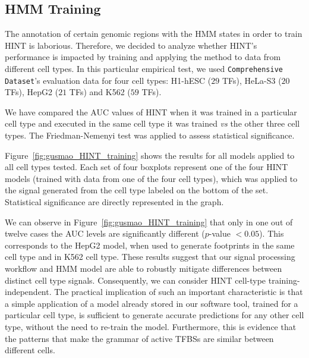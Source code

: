 \subsection{HMM Training}
\label{sec:ps.hmm.training}

The annotation of certain genomic regions with the HMM states in order to train HINT is laborious. Therefore, we decided to analyze whether HINT's performance is impacted by training and applying the method to data from different cell types. In this particular empirical test, we used {\tt Comprehensive Dataset}'s evaluation data for four cell types: H1-hESC ($29$ TFs), HeLa-S3 ($20$ TFs), HepG2 ($21$ TFs) and K562 ($59$ TFs).

We have compared the AUC values of HINT when it was trained in a particular cell type and executed in the same cell type it was trained \emph{vs} the other three cell types. The Friedman-Nemenyi test was applied to assess statistical significance.

Figure~\ref{fig:gusmao_HINT_training} shows the results for all models applied to all cell types tested. Each set of four boxplots represent one of the four HINT models (trained with data from one of the four cell types), which was applied to the signal generated from the cell type labeled on the bottom of the set. Statistical significance are directly represented in the graph.

We can observe in Figure~\ref{fig:gusmao_HINT_training} that only in one out of twelve cases the AUC levels are significantly different ($p$-value $< 0.05$). This corresponds to the HepG2 model, when used to generate footprints in the same cell type and in K562 cell type. These results suggest that our signal processing workflow and HMM model are able to robustly mitigate differences between distinct cell type signals. Consequently, we can consider HINT cell-type training-independent. The practical implication of such an important characteristic is that a simple application of a model already stored in our software tool, trained for a particular cell type, is sufficient to generate accurate predictions for any other cell type, without the need to re-train the model. Furthermore, this is evidence that the patterns that make the grammar of active TFBSs are similar between different cells.

